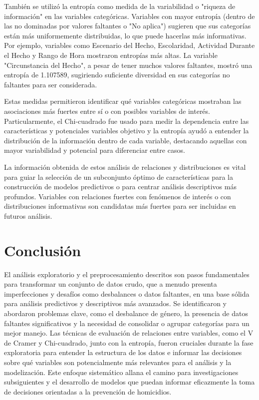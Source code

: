 \documentclass[lettersize,journal]{IEEEtran}
\begin{document}
También se utilizó la entropía como medida de la variabilidad o "riqueza de información" en las variables categóricas. Variables con mayor entropía (dentro de las no dominadas por valores faltantes o "No aplica") sugieren que sus categorías están más uniformemente distribuidas, lo que puede hacerlas más informativas. Por ejemplo, variables como Escenario del Hecho, Escolaridad, Actividad Durante el Hecho y Rango de Hora mostraron entropías más altas. La variable "Circunstancia del Hecho", a pesar de tener muchos valores faltantes, mostró una entropía de 1.107589, sugiriendo suficiente diversidad en sus categorías no faltantes para ser considerada.

Estas medidas permitieron identificar qué variables categóricas mostraban las asociaciones más fuertes entre sí o con posibles variables de interés. Particularmente, el Chi-cuadrado fue usado para medir la dependencia entre las características y potenciales variables objetivo y la entropía ayudó a entender la distribución de la información dentro de cada variable, destacando aquellas con mayor variabilidad y potencial para diferenciar entre casos.

La información obtenida de estos análisis de relaciones y distribuciones es vital para guiar la selección de un subconjunto óptimo de características para la construcción de modelos predictivos o para centrar análisis descriptivos más profundos. Variables con relaciones fuertes con fenómenos de interés o con distribuciones informativas son candidatas más fuertes para ser incluidas en futuros análisis.

\section{Conclusión}
El análisis exploratorio y el preprocesamiento descritos son pasos fundamentales para transformar un conjunto de datos crudo, que a menudo presenta imperfecciones y desafíos como desbalances o datos faltantes, en una base sólida para análisis predictivos y descriptivos más avanzados. Se identificaron y abordaron problemas clave, como el desbalance de género, la presencia de datos faltantes significativos y la necesidad de consolidar o agrupar categorías para un mejor manejo. Las técnicas de evaluación de relaciones entre variables, como el V de Cramer y Chi-cuadrado, junto con la entropía, fueron cruciales durante la fase exploratoria para entender la estructura de los datos e informar las decisiones sobre qué variables son potencialmente más relevantes para el análisis y la modelización. Este enfoque sistemático allana el camino para investigaciones subsiguientes y el desarrollo de modelos que puedan informar eficazmente la toma de decisiones orientadas a la prevención de homicidios.
\end{document}
